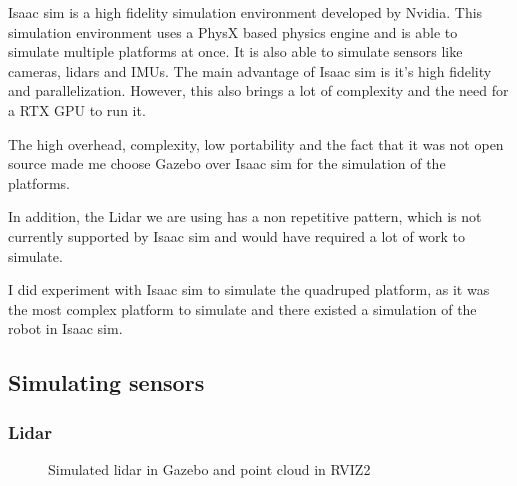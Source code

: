 \documentclass[11pt]{article}
\begin{document}
                Isaac sim is a high fidelity simulation environment developed by Nvidia. This simulation environment uses a PhysX based physics engine and is able to simulate multiple platforms at once. It is also able to simulate sensors like cameras, lidars and IMUs. The main advantage of Isaac sim is it's high fidelity and parallelization. However, this also brings a lot of complexity and the need for a RTX GPU to run it.

                The high overhead, complexity, low portability and the fact that it was not open source made me choose Gazebo over Isaac sim for the simulation of the platforms.

                In addition, the Lidar we are using has a non repetitive pattern, which is not currently supported by Isaac sim and would have required a lot of work to simulate.

                I did experiment with Isaac sim to simulate the quadruped platform, as it was the most complex platform to simulate and there existed a simulation of the robot in Isaac sim.
        \subsection{Simulating sensors}
            \subsubsection{Lidar}

            \begin{figure}[H]
                \centering
                \caption{Simulated lidar in Gazebo and point cloud in RVIZ2}
            \end{figure}
\end{document}
